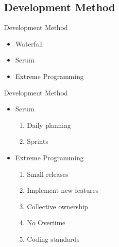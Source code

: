 \subsection{Development Method}
\begin{frame}{Development Method}
\begin{itemize}
	\item Waterfall
	\item Scrum
	\item Extreme Programming
\end{itemize}
\end{frame}
\begin{frame}{Development Method}
\begin{itemize}
	\item Scrum
	\begin{enumerate}
		\item Daily planning
		\item Sprints
	\end{enumerate}
	\item Extreme Programming
	\begin{enumerate}
		\item Small releases
		\item Implement new features
		\item Collective ownership
		\item No Overtime
		\item Coding standards
	\end{enumerate}
\end{itemize}
\end{frame}